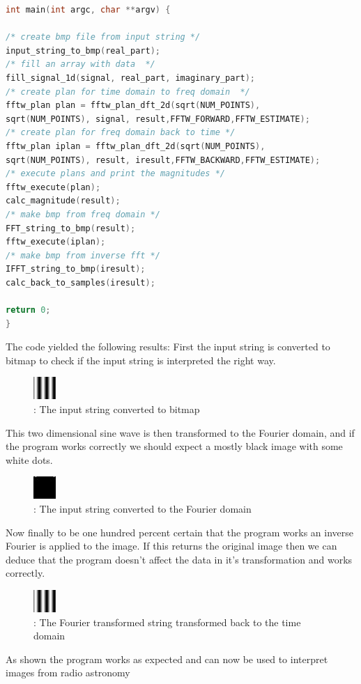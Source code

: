 \documentclass[11pt, A4, oneside]{article}
\begin{document}
\begin{lstlisting}[language=C, caption= FFTW image process main.cpp]
int main(int argc, char **argv) {

/* create bmp file from input string */
input_string_to_bmp(real_part);
/* fill an array with data  */
fill_signal_1d(signal, real_part, imaginary_part);
/* create plan for time domain to freq domain  */
fftw_plan plan = fftw_plan_dft_2d(sqrt(NUM_POINTS),
sqrt(NUM_POINTS), signal, result,FFTW_FORWARD,FFTW_ESTIMATE);
/* create plan for freq domain back to time */
fftw_plan iplan = fftw_plan_dft_2d(sqrt(NUM_POINTS),
sqrt(NUM_POINTS), result, iresult,FFTW_BACKWARD,FFTW_ESTIMATE);
/* execute plans and print the magnitudes */
fftw_execute(plan);
calc_magnitude(result);
/* make bmp from freq domain */
FFT_string_to_bmp(result);
fftw_execute(iplan);
/* make bmp from inverse fft */
IFFT_string_to_bmp(iresult);
calc_back_to_samples(iresult);

return 0;
}

\end{lstlisting}
The code yielded the following results:
First the input string is converted to bitmap to check if the input string is interpreted the right way. 

\begin{figure}[!ht]
	\centering
	\includegraphics[scale=10]{input_string}
	\caption{: The input string converted to bitmap }
	\label{input string}
\end{figure}

This two dimensional sine wave is then transformed to the Fourier domain, and if the program works correctly we should expect a mostly black image with some white dots. 

\begin{figure}[!ht]
	\centering
	\includegraphics[scale=10]{processed_string_frequency_domain}
	\caption{: The input string converted to the Fourier domain}
	\label{processed_string_frequency_domain}
\end{figure}

Now finally to be one hundred percent certain that the program works an inverse Fourier is applied to the image. If this returns the original image then we can deduce that the program doesn't affect the data in it's transformation and works correctly. 

\begin{figure}[!ht]
	\centering
	\includegraphics[scale=10]{processed_string_time_domain}
	\caption{: The Fourier transformed string transformed back to the time domain}
	\label{processed_string_time_domain}
\end{figure}

As shown the program works as expected and can now be used to interpret images from radio astronomy 


\end{document}
